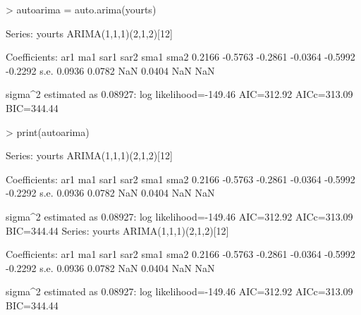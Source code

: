 \documentclass[11pt, a4paper]{article} %
\begin{document}
\begin{Schunk}
\begin{Sinput}
> autoarima = auto.arima(yourts)
\end{Sinput}
Series: yourts 
ARIMA(1,1,1)(2,1,2)[12]                    

Coefficients:
         ar1      ma1     sar1     sar2     sma1     sma2
      0.2166  -0.5763  -0.2861  -0.0364  -0.5992  -0.2292
s.e.  0.0936   0.0782      NaN   0.0404      NaN      NaN

sigma^2 estimated as 0.08927:  log likelihood=-149.46
AIC=312.92   AICc=313.09   BIC=344.44\begin{Sinput}
> print(autoarima)
\end{Sinput}
Series: yourts 
ARIMA(1,1,1)(2,1,2)[12]                    

Coefficients:
         ar1      ma1     sar1     sar2     sma1     sma2
      0.2166  -0.5763  -0.2861  -0.0364  -0.5992  -0.2292
s.e.  0.0936   0.0782      NaN   0.0404      NaN      NaN

sigma^2 estimated as 0.08927:  log likelihood=-149.46
AIC=312.92   AICc=313.09   BIC=344.44
Series: yourts 
ARIMA(1,1,1)(2,1,2)[12]                    

Coefficients:
         ar1      ma1     sar1     sar2     sma1     sma2
      0.2166  -0.5763  -0.2861  -0.0364  -0.5992  -0.2292
s.e.  0.0936   0.0782      NaN   0.0404      NaN      NaN

sigma^2 estimated as 0.08927:  log likelihood=-149.46
AIC=312.92   AICc=313.09   BIC=344.44\end{Schunk}
\end{document}
